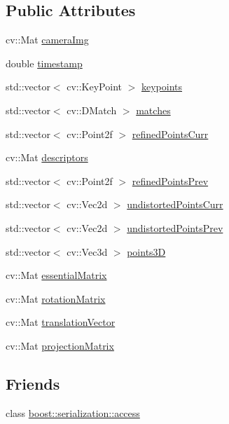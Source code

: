 \subsection*{Public Attributes}
\begin{DoxyCompactItemize}
\item 
cv\+::\+Mat \hyperlink{classFrame_af327ba7e56d6e4cd8f2917d36284ca4c}{camera\+Img}
\item 
double \hyperlink{classFrame_a360891231ed2b244f6caf3cfc8c16fb5}{timestamp}
\item 
std\+::vector$<$ cv\+::\+Key\+Point $>$ \hyperlink{classFrame_aec3f6874598eadb1e014709b28e48061}{keypoints}
\item 
std\+::vector$<$ cv\+::\+D\+Match $>$ \hyperlink{classFrame_ac7224127d7700699319bc8a8e84bef23}{matches}
\item 
std\+::vector$<$ cv\+::\+Point2f $>$ \hyperlink{classFrame_aee50f053bed60891e4582e3a478bcc1d}{refined\+Points\+Curr}
\item 
cv\+::\+Mat \hyperlink{classFrame_a358eda120b8420754f30f69007e9fecb}{descriptors}
\item 
std\+::vector$<$ cv\+::\+Point2f $>$ \hyperlink{classFrame_a548f00afc5984a717684cc2916c0bd4c}{refined\+Points\+Prev}
\item 
std\+::vector$<$ cv\+::\+Vec2d $>$ \hyperlink{classFrame_a81aae40549c6b5548cf63d050f7a19e3}{undistorted\+Points\+Curr}
\item 
std\+::vector$<$ cv\+::\+Vec2d $>$ \hyperlink{classFrame_a9efe87123d623bfe06327036ee59e423}{undistorted\+Points\+Prev}
\item 
std\+::vector$<$ cv\+::\+Vec3d $>$ \hyperlink{classFrame_a387c7eff30bc00e6375fd9efa5510d22}{points3D}
\item 
cv\+::\+Mat \hyperlink{classFrame_a07cc311d7b6e3dd5b964a4ea42a003b3}{essential\+Matrix}
\item 
cv\+::\+Mat \hyperlink{classFrame_ae6b2810e1e9d8cc8a5ba7dff9378b019}{rotation\+Matrix}
\item 
cv\+::\+Mat \hyperlink{classFrame_a5635d2b68ffd5456f6e7ad0f54d1ba29}{translation\+Vector}
\item 
cv\+::\+Mat \hyperlink{classFrame_acc5cd57f6b94c159a2f80ff6416dfb25}{projection\+Matrix}
\end{DoxyCompactItemize}
\subsection*{Friends}
\begin{DoxyCompactItemize}
\item 
class \hyperlink{classFrame_ac98d07dd8f7b70e16ccb9a01abf56b9c}{boost\+::serialization\+::access}
\end{DoxyCompactItemize}


